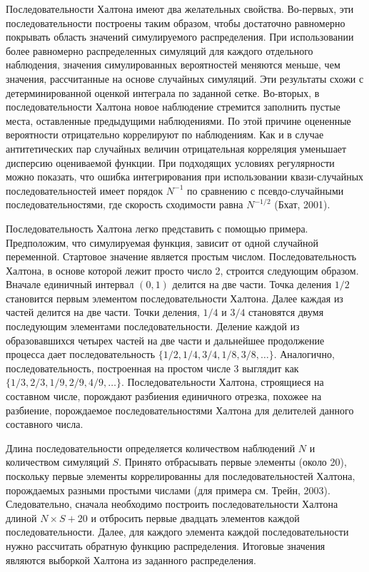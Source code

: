 Последовательности Халтона имеют два желательных свойства. Во-первых, эти последовательности построены таким образом, чтобы достаточно равномерно покрывать область значений симулируемого  распределения. При использовании более равномерно распределенных симуляций для каждого отдельного наблюдения, значения симулированных вероятностей меняются меньше, чем значения, рассчитанные на основе случайных симуляций. Эти результаты схожи с детерминированной оценкой интеграла по заданной  сетке. 
Во-вторых, в последовательности Халтона новое наблюдение стремится заполнить пустые места, оставленные предыдущими наблюдениями. По этой причине оцененные вероятности отрицательно коррелируют по наблюдениям. Как и в случае антитетических пар случайных величин отрицательная корреляция уменьшает дисперсию оцениваемой функции. При подходящих условиях регулярности можно показать, что ошибка интегрирования при использовании квази-случайных последовательностей имеет порядок $N^{-1}$ по сравнению с псевдо-случайными последовательностями, где скорость сходимости равна $N^{-1/2}$ (Бхат, 2001).

Последовательность Халтона легко представить с помощью примера. Предположим, что симулируемая функция, зависит от одной случайной переменной. Стартовое значение является простым числом. Последовательность Халтона, в основе которой лежит просто число 2, строится следующим образом. Вначале единичный интервал $(0,1)$ делится на две части. Точка деления $1/2$ становится первым элементом последовательности Халтона. Далее каждая из частей делится на две части. Точки деления, $1/4$ и $3/4$ становятся двумя последующим элементами последовательности. Деление каждой из образовавшихся четырех частей на две части и дальнейшее продолжение процесса дает последовательность $\lbrace1/2,1/4,3/4,1/8,3/8,\ldots \rbrace$. Аналогично, последовательность, построенная на простом числе 3 выглядит как $\lbrace1/3,2/3,1/9,2/9,4/9,\ldots \rbrace$. Последовательности Халтона, строящиеся на составном числе, порождают разбиения единичного отрезка, похожее на разбиение, порождаемое последовательностями Халтона для делителей данного составного числа.

Длина последовательности определяется количеством наблюдений $N$ и количеством симуляций $S$. Принято отбрасывать первые элементы (около 20), поскольку первые элементы коррелированны для последовательностей Халтона, порождаемых разными простыми числами (для примера см. Трейн, 2003). Следовательно, сначала необходимо построить последовательности Халтона длиной $N\times S+20$ и отбросить первые двадцать элементов каждой последовательности. Далее, для каждого элемента каждой последовательности нужно рассчитать обратную функцию  распределения. Итоговые значения являются выборкой Халтона из заданного распределения.


